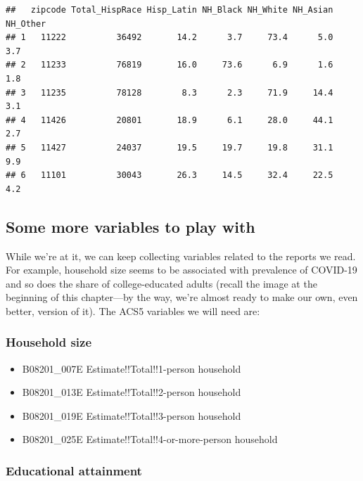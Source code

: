 \documentclass[openany]{book}
\providecommand{\tightlist}{%
  \setlength{\itemsep}{0pt}\setlength{\parskip}{0pt}}
\begin{document}
\begin{verbatim}
##   zipcode Total_HispRace Hisp_Latin NH_Black NH_White NH_Asian NH_Other
## 1   11222          36492       14.2      3.7     73.4      5.0      3.7
## 2   11233          76819       16.0     73.6      6.9      1.6      1.8
## 3   11235          78128        8.3      2.3     71.9     14.4      3.1
## 4   11426          20801       18.9      6.1     28.0     44.1      2.7
## 5   11427          24037       19.5     19.7     19.8     31.1      9.9
## 6   11101          30043       26.3     14.5     32.4     22.5      4.2
\end{verbatim}

\hypertarget{some-more-variables-to-play-with}{%
\subsection*{Some more variables to play with}\label{some-more-variables-to-play-with}}

While we're at it, we can keep collecting variables related to the reports we read. For example, household size seems to be associated with prevalence of COVID-19 and so does the share of college-educated adults (recall the image at the beginning of this chapter---by the way, we're almost ready to make our own, even better, version of it). The ACS5 variables we will need are:

\hypertarget{household-size}{%
\subsubsection*{Household size}\label{household-size}}

\begin{itemize}
\tightlist
\item
  B08201\_007E Estimate!!Total!!1-person household
\item
  B08201\_013E Estimate!!Total!!2-person household
\item
  B08201\_019E Estimate!!Total!!3-person household
\item
  B08201\_025E Estimate!!Total!!4-or-more-person household
\end{itemize}

\hypertarget{educational-attainment}{%
\subsubsection*{Educational attainment}\label{educational-attainment}}
\end{document}

